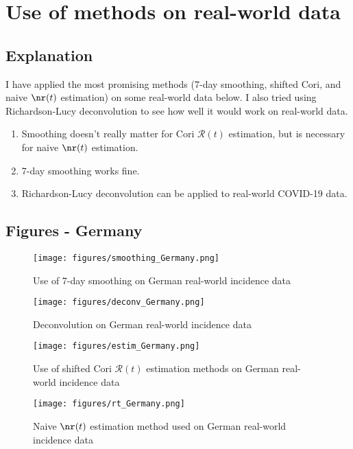 \documentclass{article}
\newcommand{\nR}{\mathscr{R}}
\begin{document}
\section{Use of methods on real-world data}
\subsection{Explanation}
I have applied the most promising methods (7-day smoothing, shifted Cori, and naive $\nr(t)$ estimation) on some real-world data below. I also tried using Richardson-Lucy deconvolution to see how well it would work on real-world data. 

\begin{enumerate}
    \item Smoothing doesn't really matter for Cori $\nR(t)$ estimation, but is necessary for naive $\nr(t)$ estimation.
    \item 7-day smoothing works fine. 
    \item Richardson-Lucy deconvolution can be applied to real-world COVID-19 data.
\end{enumerate}


\subsection{Figures - Germany}
\begin{figure}[h!]
    \centering
    \texttt{[image: figures/smoothing\_Germany.png]}
    \caption{Use of 7-day smoothing on German real-world incidence data}
    \label{fig:my_label}
\end{figure}

\begin{figure}
    \centering
    \texttt{[image: figures/deconv\_Germany.png]}
    \caption{Deconvolution on German real-world incidence data}
    \label{fig:my_label}
\end{figure}

\begin{figure}[h!]
    \centering
    \texttt{[image: figures/estim\_Germany.png]}
    \caption{Use of shifted Cori $\nR(t)$ estimation methods on German real-world incidence data}
    \label{fig:my_label}
\end{figure}

\clearpage
\begin{figure}[h!]
    \centering
    \texttt{[image: figures/rt\_Germany.png]}
    \caption{Naive $\nr(t)$ estimation method used on German real-world incidence data}
    \label{fig:my_label}
\end{figure}
\end{document}
